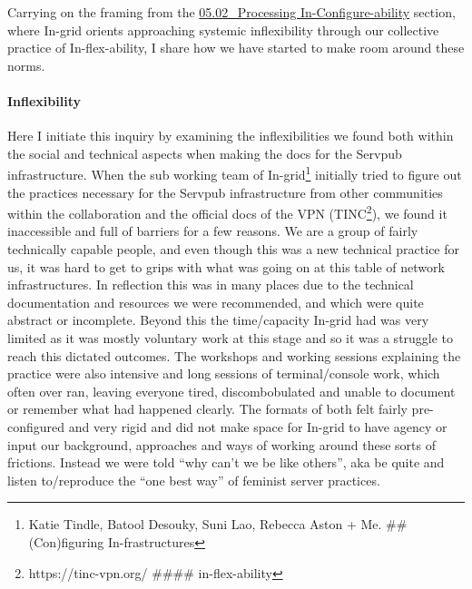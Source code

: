 Carrying on the framing from the
\href{05.02_Processing\%20In-Configure-ability.md}{05.02\_Processing
In-Configure-ability} section, where In-grid orients approaching
systemic inflexibility through our collective practice of
In-flex-ability, I share how we have started to make room around these
norms.

\hypertarget{inflexibility}{%
\paragraph[Inflexibility]{\texorpdfstring{\protect\hypertarget{anchor}{}{}Inflexibility}{Inflexibility}}\label{inflexibility}}

Here I initiate this inquiry by examining the inflexibilities we found
both within the social and technical aspects when making the docs for
the Servpub infrastructure. When the sub working team of
In-grid\footnote{Katie Tindle, Batool Desouky, Suni Lao, Rebecca Aston +
  Me. \#\# (Con)figuring In-frastructures} initially tried to figure out
the practices necessary for the Servpub infrastructure from other
communities within the collaboration and the official docs of the VPN
(TINC\footnote{https://tinc-vpn.org/ \#\#\#\# in-flex-ability}), we
found it inaccessible and full of barriers for a few reasons. We are a
group of fairly technically capable people, and even though this was a
new technical practice for us, it was hard to get to grips with what was
going on at this table of network infrastructures. In reflection this
was in many places due to the technical documentation and resources we
were recommended, and which were quite abstract or incomplete. Beyond
this the time/capacity In-grid had was very limited as it was mostly
voluntary work at this stage and so it was a struggle to reach this
dictated outcomes. The workshops and working sessions explaining the
practice were also intensive and long sessions of terminal/console work,
which often over ran, leaving everyone tired, discombobulated and unable
to document or remember what had happened clearly. The formats of both
felt fairly pre-configured and very rigid and did not make space for
In-grid to have agency or input our background, approaches and ways of
working around these sorts of frictions. Instead we were told ``why
can't we be like others'', aka be quite and listen to/reproduce the
``one best way'' of feminist server practices.

